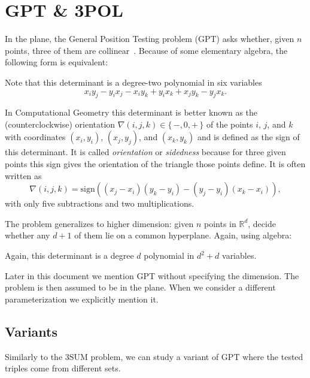 \section{GPT \& 3POL}%
\label{sec:problem:pol}

In the plane, the General Position Testing problem (GPT) asks whether, given
\(n\) points, three of them are collinear~\cite{???}.
%
Because of some elementary algebra, the following form is equivalent:
%


Note that this determinant is a degree-two polynomial in six variables
\begin{displaymath}
	x_i y_j - y_i x_j - x_i y_k + y_i x_k + x_j y_k - y_j x_k.
\end{displaymath}

In Computational Geometry this determinant is better known as
the (counterclockwise) orientation \(\nabla(i,j,k) \in \{\, -, 0, +\,\}\) of
the points
\(i\), \(j\), and \(k\) with coordinates \((x_i, y_i)\), \((x_j, y_j)\), and
\((x_k, y_k)\) and is defined as the sign of this determinant.
%
It is called \emph{orientation} or \emph{sidedness}
because for three given points this sign
gives the orientation of the triangle those points define.
%
It is often written as
\begin{displaymath}
    \nabla(i,j,k) = \mathrm{sign}((x_j - x_i)(y_k - y_i) - (y_j - y_i)(x_k - x_i)),
\end{displaymath}
with only five subtractions and two multiplications.

The problem generalizes to higher dimension: given \(n\) points in
\(\mathbb{R}^d\), decide whether any \(d+1\) of them lie on a common
hyperplane. Again, using algebra:
%


Again, this determinant is a degree \(d\) polynomial in
\(d^2 + d\) variables.

Later in this document we mention GPT without specifying the dimension.
The problem is then assumed to be in the plane.
When we consider a different parameterization we explicitly mention it.

\subsection{Variants}%
\label{sec:problem:pol:variants}

Similarly to the 3SUM problem, we can study a
variant of GPT where the tested triples come from different sets.
%


